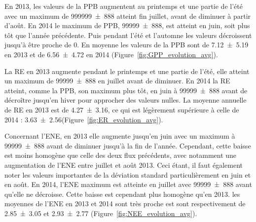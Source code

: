 En 2013, les valeurs de la PPB augmentent au printemps et une partie de l'été avec un maximum de \SI{999999(888)}{\uml} atteint fin juillet, avant de diminuer à partir d'août.
En 2014 le maximum de PPB, \SI{99999(888)}{\uml}, est atteint en juin, soit plus tôt que l'année précédente.
Puis pendant l'été et l'automne les valeurs décroissent jusqu'à être proche de 0.
En moyenne les valeurs de la PPB sont de \SI{7.12(519)}{\uml} en 2013 et de \SI{6.56(472)}{\uml} en 2014 (Figure~\ref{fig:GPP_evolution_avg}).




La RE en 2013 augmente pendant le printemps et une partie de l'été, elle atteint un maximum de \SI{99999(888)}{\uml} en juillet avant de diminuer.
En 2014 la RE atteint, comme la PPB, son maximum plus tôt, en juin à \SI{99999(888)}{\uml} avant de décroître jusqu'en hiver pour approcher des valeurs nulles.
La moyenne annuelle de RE en 2013 est de \SI{4.27(316)}{\uml}, ce qui est légèrement supérieure à celle de 2014 : \SI{3.63(256)}{\uml}(Figure~\ref{fig:ER_evolution_avg}).





Concernant l'ENE, en 2013 elle augmente jusqu'en juin avec un maximum à \SI{99999(888)}{\uml} avant de diminuer jusqu'à la fin de l'année.
Cependant, cette baisse est moins homogène que celle des deux flux précédents, avec notamment une augmentation de l'ENE entre juillet et août 2013.
Ceci étant, il faut également noter les valeurs importantes de la déviation standard particulièrement en juin et en août.
En 2014, l'ENE maximum est atteinte en juillet avec \SI{99999(888)}{\uml} avant qu'elle ne décroisse.
Cette baisse est cependant plus homogène qu'en 2013.
les moyennes de l'ENE en 2013 et 2014 sont très proche est sont respectivement de \SI{2.85(305)}{\uml} et \SI{2.93(277)}{\uml} (Figure~\ref{fig:NEE_evolution_avg}).



